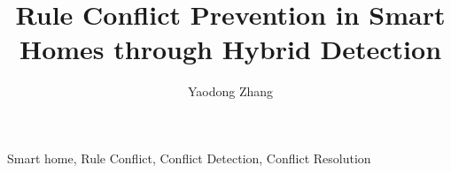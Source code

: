 \documentclass[10pt,journal,compsoc,twoside]{IEEEtran}
\begin{document}
\title{Rule Conflict Prevention in Smart Homes through Hybrid Detection}

\author{Yaodong Zhang\\
}

\maketitle



\begin{IEEEkeywords}
Smart home, Rule Conflict, Conflict Detection, Conflict Resolution 
\end{IEEEkeywords}












\end{document}
